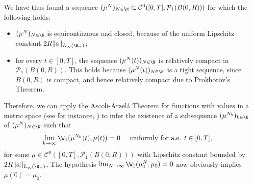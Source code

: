 We have thus found a sequence $(\mu^N)_{N \in \N} \subset \mathcal{C}^0([0,T],\mathcal{P}_1(B(0,R)))$ for which the following holds:
\begin{itemize}
\item $(\mu^N)_{N \in \N}$ is equicontinuous and closed, because of the uniform Lipschitz constant $2R\|a\|_{L_{\infty}(\R_+)}$;
\item for every $t \in [0,T]$, the sequence $(\mu^N(t))_{N \in \N}$ is relatively compact in $\mathcal{P}_1(B(0,R))$. This holds because $(\mu^N(t))_{N \in \N}$ is a tight sequence, since $B(0,R)$ is compact, and hence relatively compact due to Prokhorov's Theorem.
\end{itemize}
Therefore, we can apply the Ascoli-Arzel\'{a} Theorem for functions with values in a metric space (see for instance, \cite[Chapter 7, Theorem 18]{KelleyTop}) to infer the existence of a subsequence $(\mu^{N_k})_{k \in \N}$ of $(\mu^N)_{N \in \N}$ such that
\begin{align}\label{eq:unifconv}
\lim_{k \rightarrow \infty}\W_1(\mu^{N_k}(t),\mu(t)) = 0 \quad \text{ uniformly for a.e. } t \in [0,T],
\end{align}
for some $\mu \in \mathcal{C}^0([0,T],\mathcal{P}_1(B(0,R)))$ with Lipschitz constant bounded by $2R\|a\|_{L_{\infty}(\R_+)}$. The hypothesis $\lim_{N\rightarrow\infty}\W_1(\mu^N_0,\mu_0) = 0$ now obviously implies $\mu(0) = \mu_0$.

